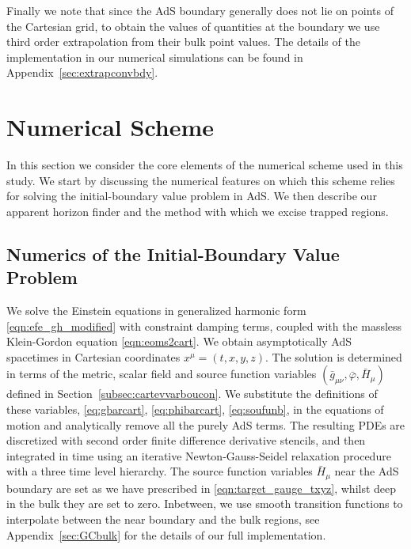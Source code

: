 \documentclass[a4paper,11pt]{article}
\numberwithin{equation}{section}
\begin{document}
Finally we note that since the AdS boundary generally does not lie on points of the Cartesian grid, to obtain the values of quantities at the boundary we use third order extrapolation from their bulk point values. The details of the implementation in our numerical simulations can be found in Appendix~\ref{sec:extrapconvbdy}.


\section{Numerical Scheme}\label{sec:numerical_scheme}

In this section we consider the core elements of the numerical scheme used in this study. %
We start by discussing the numerical features on which this scheme relies for solving the initial-boundary value problem in AdS. 
We then describe our apparent horizon finder and the method with which we excise trapped regions.

\subsection{Numerics of the Initial-Boundary Value Problem}
\label{sec:numcauprob}
We solve the Einstein equations in generalized harmonic form \eqref{eqn:efe_gh_modified} with constraint damping terms, coupled with the massless Klein-Gordon equation \eqref{eqn:eoms2cart}.
We obtain asymptotically AdS spacetimes in Cartesian coordinates $x^\mu=(t,x,y,z)$. 
The solution is determined in terms of the metric, scalar field and source function variables $(\bar{g}_{\mu\nu},\bar{\varphi},\bar{H}_\mu)$ defined in Section~\ref{subsec:cartevvarboucon}. We substitute the definitions of these variables, \eqref{eq:gbarcart}, \eqref{eq:phibarcart}, \eqref{eq:soufunb}, in the equations of motion and analytically remove all the purely AdS terms.
The resulting PDEs are discretized with second order finite difference derivative stencils, and then integrated in time using an iterative Newton-Gauss-Seidel relaxation procedure with a three time level hierarchy.
The source function variables $\bar{H}_\mu$ near the AdS boundary are set as we have prescribed in \eqref{eqn:target_gauge_txyz}, whilst deep in the bulk they are set to zero. 
Inbetween, we use smooth transition functions to interpolate between the near boundary and the bulk regions, see Appendix~\ref{sec:GCbulk}  for the details of our full implementation. %
\end{document}
